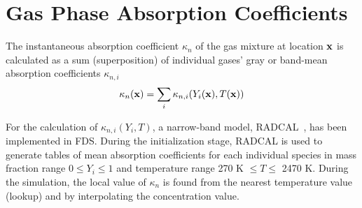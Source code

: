 

\chapter{Gas Phase Absorption Coefficients}
\label{absorption_coefficients}

The instantaneous absorption coefficient $\kappa_n$ of the gas mixture at location ${\mathbf{x}}$ is calculated as a sum (superposition) of individual gases' gray or band-mean absorption coefficients $\kappa_{n,i}$
\begin{equation}
\kappa_{n}({\mathbf{x}}) = \sum_i \kappa_{n,i}(Y_i({\mathbf{x}}),T({\mathbf{x}}))
\end{equation}

For the calculation of $\kappa_{n,i}(Y_i,T)$, a narrow-band model, RADCAL~\cite{RadCal}, has been
implemented in FDS. During the initialization stage, RADCAL is used to generate tables of mean absorption coefficients for each individual species in mass fraction range $0 \leq Y_i \leq 1$ and temperature range 270 K $ \leq T \leq $ 2470 K. During the simulation, the local value of $\kappa_n$ is found from the nearest temperature value (lookup) and by interpolating the concentration value.

